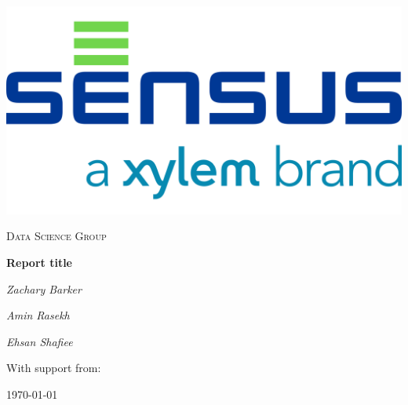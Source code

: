 \begin{titlepage}


\thispagestyle{empty}
\setlength\headheight{0pt} 
\begin{center}

\begin{center}
\includegraphics[width=0.25\linewidth]{img/sensus_xylem_logo.png}            
\end{center}	

        \vspace{0.25cm}
        {\scshape\LARGE Data Science Group \par}
        \vspace{2cm}

        {\Large\bfseries Report title\par}
        \vspace{2cm}
        {\Large\itshape Zachary Barker\par}
        {\Large\itshape Amin Rasekh\par}
        {\Large\itshape Ehsan Shafiee\par}

\vspace{1cm}
With support from:\par
\vspace{3.5cm}
\large
\today

\end{center}

\clearpage
\restoregeometry
\end{titlepage} 	
